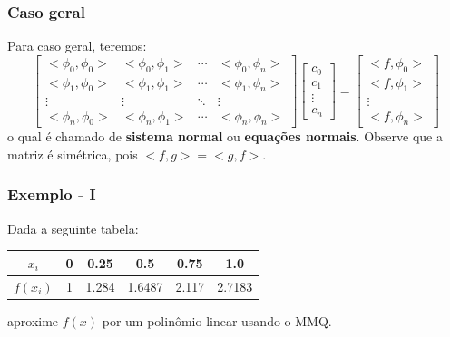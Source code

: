 \documentclass{beamer}
\theoremstyle{mystyle}
\begin{document}
 	\begin{frame}
 		\frametitle{Caso geral}
 		Para caso geral, teremos:
 		\begin{equation*}
 			\left[ \begin{array}{cccc}
 				<\phi_{0},\phi_{0}> & <\phi_{0},\phi_{1}> & \cdots & <\phi_{0},\phi_{n}>\\
 				<\phi_{1},\phi_{0}> & <\phi_{1},\phi_{1}> & \cdots & <\phi_{1},\phi_{n}>\\
 				\vdots & \vdots & \ddots & \vdots\\
 				<\phi_{n},\phi_{0}> & <\phi_{n},\phi_{1}> & \cdots & <\phi_{n},\phi_{n}>
 			\end{array}\right]
 			\left[ \begin{array}{c}
 				c_{0}\\
 				c_{1}\\
 				\vdots\\
 				c_{n}
 			\end{array} \right]
 			= \left[ \begin{array}{c}
 				<f,\phi_{0}>\\
 				<f,\phi_{1}>\\
 				\vdots\\
 				<f,\phi_{n}>
 			\end{array} \right]
 		\end{equation*}
 		o qual é chamado de \textbf{sistema normal} ou \textbf{equações normais}. Observe que a matriz é simétrica, pois $ < f , g > = < g , f > $.
 	\end{frame}
 	
	\begin{frame}
		\frametitle{Exemplo - I}
		Dada a seguinte tabela:
		\begin{table}
			\small 
			\centering
			\begin{tabular}{c|ccccc}
				$ x_{i} $ & 0 & 0.25 & 0.5 & 0.75 & 1.0 \\
				\hline
				$ f(x_{i}) $ & 1 & 1.284 & 1.6487 & 2.117 & 2.7183
			\end{tabular}
		\end{table}
		aproxime $ f (x) $ por um polinômio linear usando o MMQ.
	\end{frame}
\end{document}
